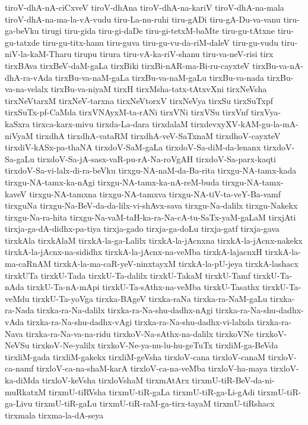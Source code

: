 {tiroV-dhA-nA-ciCxveV
tiroV-dhAna
tiroV-dhA-na-kariV
tiroV-dhA-na-mala
tiroV-dhA-na-ma-la-vA-vudu
tiru-La-nu-ruhi
tiru-gADi
tiru-gA-Du-va-vanu
tiru-ga-beVku
tirugi
tiru-gida
tiru-gi-daDe
tiru-gi-tetxM-baMte
tiru-gu-tAtxne
tiru-gu-tatxde
tiru-gu-titx-hanu
tiru-guva
tiru-gu-vu-da-riM-daleV
tiru-gu-vudu
tiru-niV-la-kaM-Tharu
tirupu
tirura
tiru-vA-ka-riV-shanu
tiru-va-neV-risi
tirx
tirxBAva
tirxBeV-daM-gaLa
tirxBiki
tirxBi-nAR-ma-Bi-ru-cayxteV
tirxBu-va-nA-dhA-ra-vAda
tirxBu-va-naM-gaLa
tirxBu-va-naM-gaLu
tirxBu-va-nada
tirxBu-va-na-velalx
tirxBu-va-niyaM
tirxH
tirxMsha-tatx-tAtxvXni
tirxNeVsha
tirxNeVtarxM
tirxNeV-tarxna
tirxNeVtorxV
tirxNeVya
tirxSu
tirxSuTxpf
tirxSuTx-pf-CaMda
tirxVNAyxM-ta-rANi
tirxVNi
tirxVSu
tirxVnf
tirxVya-kaSxra
tirxca-karx-mivu
tirxda-La-dara
tirxdalaM
tirxdevxyXV-kAM-gu-la-mA-niVyaM
tirxdhA
tirxdhA-vataRM
tirxdhA-veV-SaTxnaM
tirxdhoV-cayxteV
tirxdiV-kASx-pa-thaNA
tirxdoV-SaM-gaLa
tirxdoV-Sa-diM-da-lenanx
tirxdoV-Sa-gaLu
tirxdoV-Sa-jA-sasx-vaR-pu-rA-Na-roVgAH
tirxdoV-Sa-parx-kaqti
tirxdoV-Sa-vi-lalx-di-ra-beVku
tirxgu-NA-naM-da-Ba-rita
tirxgu-NA-tamx-kada
tirxgu-NA-tamx-ka-nAgi
tirxgu-NA-tamx-ka-nA-reM-buda
tirxgu-NA-tamx-kaveV
tirxgu-NA-tamxna
tirxgu-NA-tamxva
tirxgu-NA-tiV-ta-veY-Ba-vamf
tirxguNa
tirxgu-Na-BeV-da-da-lilx-vi-shAvx-sava
tirxgu-Na-dalilx
tirxgu-Nakekx
tirxgu-Na-ra-hita
tirxgu-Na-vaM-taH-ka-ra-Na-cA-tu-SaTx-yaM-gaLaM
tirxjAti
tirxja-ga-dA-didhx-pa-tiya
tirxja-gado
tirxja-ga-doLu
tirxja-gatf
tirxja-gava
tirxkAla
tirxkAlaM
tirxkA-la-ga-Lalilx
tirxkA-la-jAcnxna
tirxkA-la-jAcnx-nakekx
tirxkA-la-jAcnx-na-sididhx
tirxkA-la-jAcnx-na-veMba
tirxkA-lajacnxH
tirxkA-la-ma-caRnAM
tirxkA-la-ma-caR-yeV-ninxtayxM
tirxkA-la-pU-jeya
tirxkA-lashacx
tirxkUTa
tirxkU-Tada
tirxkU-Ta-dalilx
tirxkU-TakaM
tirxkU-Tamf
tirxkU-Ta-nAda
tirxkU-Ta-nA-mApi
tirxkU-Ta-sAthx-na-veMba
tirxkU-Tasathx
tirxkU-Ta-veMdu
tirxkU-Ta-yoVga
tirxka-BAgeV
tirxka-raNa
tirxka-ra-NaM-gaLu
tirxka-ra-Nada
tirxka-ra-Na-dalilx
tirxka-ra-Na-shu-dadhx-nAgi
tirxka-ra-Na-shu-dadhx-vAda
tirxka-ra-Na-shu-dadhx-vAgi
tirxka-ra-Na-shu-dadhx-vi-lalxda
tirxka-ra-Nava
tirxka-ra-Na-va-na-ridu
tirxkoV-Na-sAthx-na-dalilx
tirxkoVNe
tirxkoV-NeVSu
tirxkoV-Ne-yalilx
tirxkoV-Ne-ya-nu-lu-hu-geTuTx
tirxliM-ga-BeVda
tirxliM-gada
tirxliM-gakekx
tirxliM-geVsha
tirxloV-cana
tirxloV-canaM
tirxloV-ca-namf
tirxloV-ca-na-shaM-karA
tirxloV-ca-na-veMba
tirxloV-ha-maya
tirxloV-ka-diMda
tirxloV-keVsha
tirxloVshaM
tirxmAtArx
tirxmU-tiR-BeV-da-ni-muRkatxM
tirxmU-tiRVsha
tirxmU-tiR-gaLa
tirxmU-tiR-ga-Li-gAdi
tirxmU-tiR-ga-Livu
tirxmU-tiR-gaLu
tirxmU-tiR-raM-ga-tirx-tayaM
tirxmU-tiRshacx
tirxmala
tirxma-la-dA-seya
}
